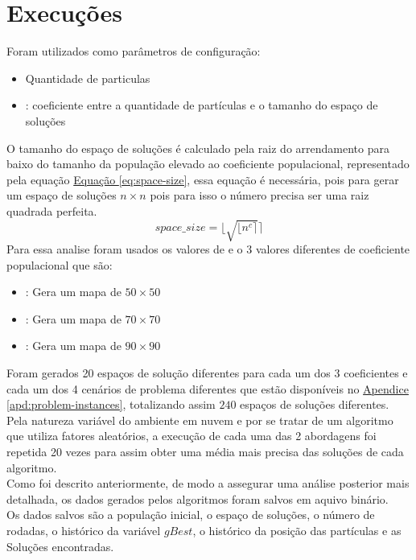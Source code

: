 \section{Execuções}
Foram utilizados como parâmetros de configuração:
\begin{itemize}
    \item {} Quantidade de particulas
    \item {}: coeficiente entre a quantidade de partículas e o tamanho do espaço de soluções
\end{itemize}
%
O tamanho do espaço de soluções é calculado pela raiz do arrendamento para baixo do tamanho da população elevado ao coeficiente populacional, representado pela equação 
\hyperref[eq:space-size]{Equação \ref{eq:space-size}}, 
essa equação é necessária, pois para gerar um espaço de soluções $n \times n$ pois para isso o número precisa ser uma raiz quadrada perfeita.
%
\begin{equation} 
    \label{eq:space-size}
    space\_size = \lfloor \sqrt{\lfloor n^c \rceil} \rceil
\end{equation}
%
Para essa analise foram usados os valores de  e o 3 valores diferentes de coeficiente populacional que são:
\begin{itemize}
    \item {}: Gera um mapa de $50 \times 50$
    \item {}: Gera um mapa de $70 \times 70$
    \item {}: Gera um mapa de $90 \times 90$
\end{itemize}

Foram gerados 20 espaços de solução diferentes para cada um dos 3 coeficientes e cada um dos 4 cenários de problema diferentes que estão disponíveis no 
\hyperref[apd:problem-instances]{Apendice \ref{apd:problem-instances}}, totalizando assim $240$ espaços de soluções diferentes.\\
%
Pela natureza variável do ambiente em nuvem e por se tratar de um algoritmo que utiliza fatores aleatórios, a execução de cada uma das 2 abordagens foi repetida 20 vezes para assim obter uma média mais precisa das soluções de cada algoritmo.\\
%
Como foi descrito anteriormente, de modo a assegurar uma análise posterior mais detalhada, os dados gerados pelos algoritmos foram salvos em aquivo binário.\\
Os dados salvos são a população inicial, o espaço de soluções, o número de rodadas, o histórico da variável $gBest$, o histórico da posição das partículas e as Soluções encontradas.
